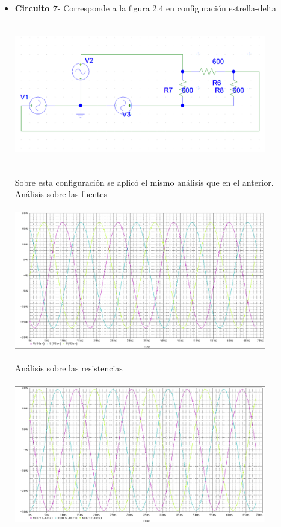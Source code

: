 \documentclass[12pt]{article}
\begin{document}
\begin{itemize}
		\item \textbf{Circuito 7}- Corresponde a la figura 2.4 en configuración estrella-delta\\
		
		\includegraphics[width=11cm,height=7cm]{Img/trifas_str_dlt}\\
		
		\noindent Sobre esta configuración se aplicó el mismo análisis que en el anterior.\\
		
		\noindent Análisis sobre las fuentes\\
		
		\includegraphics[width=11cm,height=7cm]{Img/Circuito_trifasico_estrella_delta}\\
		
		\noindent Análisis sobre las resistencias\\
		
		\includegraphics[width=11cm,height=7cm]{Img/Circ_trifas_estr_delta_resist}
		

\end{itemize}
\end{document}
